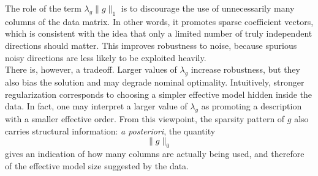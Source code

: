 The role of the term \(\lambda_g\|g\|_1\) is to discourage the use of unnecessarily many columns of the data matrix. In other words, it promotes sparse coefficient vectors, which is consistent with the idea that only a limited number of truly independent directions should matter. This improves robustness to noise, because spurious noisy directions are less likely to be exploited heavily.\\
There is, however, a tradeoff. Larger values of \(\lambda_g\) increase robustness, but they also bias the solution and may degrade nominal optimality. Intuitively, stronger regularization corresponds to choosing a simpler effective model hidden inside the data. In fact, one may interpret a larger value of \(\lambda_g\) as promoting a description with a smaller effective order. From this viewpoint, the sparsity pattern of \(g\) also carries structural information: \emph{a posteriori}, the quantity
\[
\|g\|_0
\]
gives an indication of how many columns are actually being used, and therefore of the effective model size suggested by the data.\\

